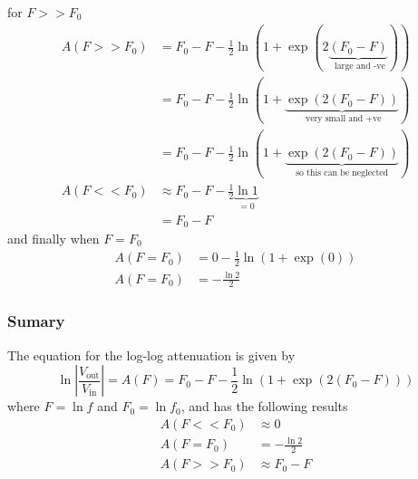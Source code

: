for $F>>F_0$
\begin{align}
  A(F>>F_0) &= F_0 - F  -\frac{1}{2} \ln\left(1+\exp(2\underbrace{(F_0 - F)}_{\text{ large and -ve}})\right) \nonumber \\
  &= F_0 - F  -\frac{1}{2} \ln\left(1+\underbrace{\exp(2(F_0 - F))}_{\text{ very small and +ve}}\right) \nonumber \\
  &= F_0 - F  -\frac{1}{2} \ln\left(1+\underbrace{\exp(2(F_0 - F))}_{\text{so this can be neglected}}\right) \nonumber \\
  A(F<<F_0) &\approx F_0 - F  -\frac{1}{2} \underbrace{\ln 1}_{=0} \nonumber \\
  &= F_0 - F \label{eq:RC_log_log_large_F}
\end{align}
and finally when $F=F_0$
\begin{align}
  A(F=F_0) &=  0 -\frac{1}{2} \ln\left(1+\exp(0)\right) \nonumber \\
  A(F=F_0) &= -\frac{\ln 2}{2} \label{eq:RC_log_log_equal}
\end{align}

\begin{framed}
\subsubsection*{Sumary}
The equation for the log-log attenuation is given by
\begin{equation*}
\ln \left|\frac{V_{\text{out}}}{V_{\text{in}}} \right| = A(F) = F_0 - F  -\frac{1}{2} \ln\left(1+\exp(2(F_0 - F))\right)
\end{equation*}
where $F=\ln f$ and $F_0 = \ln f_0$, and has the following results
\begin{align*}
   A(F<<F_0) &\approx 0 \\
   A(F=F_0) &= -\frac{\ln 2}{2} \\
   A(F>>F_0) &\approx F_0 - F 
\end{align*}
\end{framed}
